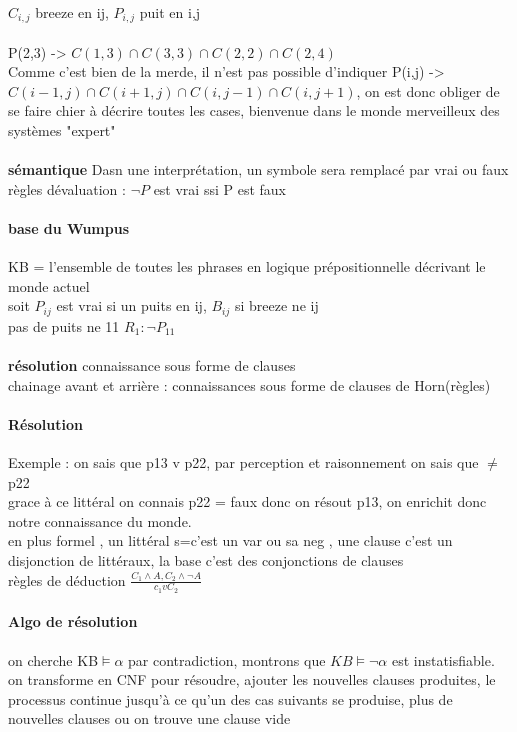 \documentclass{article}
\begin{document}
\paragraph{}
$C_{i,j}$ breeze en ij, $P_{i,j}$ puit en i,j\\\\
P(2,3) -> $C(1,3)\cap C(3,3)\cap C(2,2)\cap C(2,4)$\\
Comme c'est bien de la merde, il n'est pas possible d'indiquer P(i,j) -> $C(i-1,j)\cap C(i+1,j)\cap C(i,j-1)\cap C(i,j+1)$, on est donc obliger de se faire chier à décrire toutes les cases, bienvenue dans le monde merveilleux des systèmes "expert"\\\\\textbf{sémantique} Dasn une interprétation, un symbole sera remplacé par vrai ou faux\\règles dévaluation : $\neg P$ est vrai ssi P est faux
\paragraph{base du Wumpus}
KB = l'ensemble de toutes les phrases en logique prépositionnelle décrivant le monde actuel\\soit $P_{ij}$ est vrai si un puits en ij, $B_{ij}$ si breeze ne ij\\pas de puits ne 11 $R_1 : \neg P_{11}$ \\\\\textbf{résolution} connaissance sous forme de clauses\\chainage avant et arrière : connaissances sous forme de clauses de Horn(règles)
\paragraph{Résolution} Exemple : on sais que p13 v p22, par perception et raisonnement on sais que $\neq$p22\\grace à ce littéral on connais p22 = faux donc on résout p13, on enrichit donc notre connaissance du monde.\\en plus formel , un littéral s=c'est un var ou sa neg , une clause c’est un disjonction de littéraux, la base c'est des conjonctions de clauses\\règles de déduction $ \frac{C_1 \wedge A , C_2 \wedge \neg A}{c_1 v C_2}$
\paragraph{Algo de résolution} on cherche KB$\models \alpha$ par contradiction, montrons que $KB\models \neg \alpha$ est instatisfiable. on transforme en CNF pour résoudre, ajouter les nouvelles clauses produites, le processus continue jusqu'à ce qu'un des cas suivants se produise, plus de nouvelles clauses ou on trouve une clause vide
\end{document}
